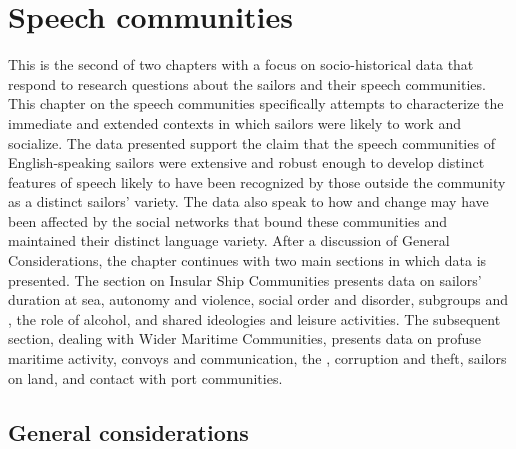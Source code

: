 \chapter{{Speech communities}}\label{sec:4}

This is the second of two chapters with a focus on socio-historical data that respond to research questions about the sailors and their speech communities. This chapter on the speech communities specifically attempts to characterize the immediate and extended contexts in which sailors were likely to work and socialize. The data presented support the claim that the speech communities of English-speaking sailors were extensive and robust enough to develop distinct features of speech likely to have been recognized by those outside the community as a distinct sailors’ variety. The data also speak to how  and change may have been affected by the social networks that bound these communities and maintained their distinct language variety. After a discussion of General Considerations, the chapter continues with two main sections in which data is presented. The section on Insular Ship Communities presents data on sailors’ duration at sea, autonomy and violence, social order and disorder, subgroups and , the role of alcohol, and shared ideologies and leisure activities. The subsequent section, dealing with Wider Maritime Communities, presents data on profuse maritime activity, convoys and communication, the , corruption and theft, sailors on land, and contact with port communities. 

\section{{General considerations}}\label{sec:4.1}

